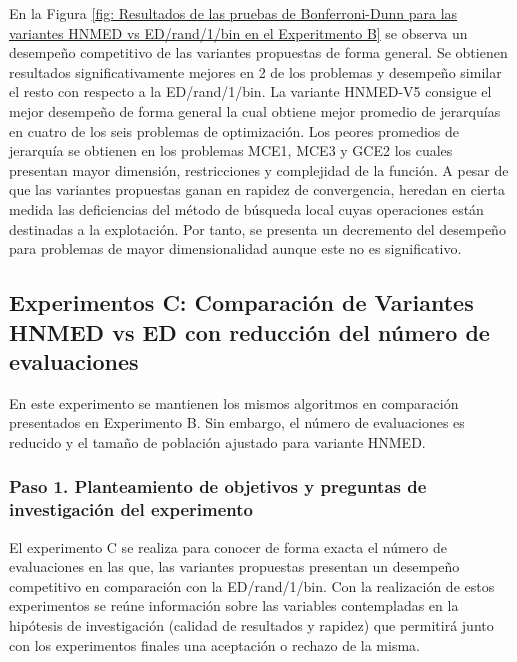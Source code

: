 En la Figura \ref{fig: Resultados de las pruebas de Bonferroni-Dunn para las variantes HNMED vs ED/rand/1/bin en el Experitmento B} se observa un desempeño competitivo de las variantes propuestas de forma general. Se obtienen resultados significativamente mejores en 2 de los problemas y desempeño similar el resto con respecto a la ED/rand/1/bin. La variante HNMED-V5 consigue el mejor desempeño de forma general la cual obtiene mejor promedio de jerarquías en cuatro de los seis problemas de optimización. Los peores promedios de jerarquía se obtienen en los problemas MCE1, MCE3 y GCE2 los cuales presentan mayor dimensión, restricciones y complejidad de la función. A pesar de que las variantes propuestas ganan en rapidez de convergencia, heredan en cierta medida las deficiencias del método de búsqueda local cuyas operaciones están destinadas a la explotación. Por tanto, se presenta un decremento del desempeño para problemas de mayor dimensionalidad aunque este no es significativo.








\subsection{Experimentos C: Comparación de Variantes HNMED vs ED con reducción del número de evaluaciones}
En este experimento se mantienen los mismos algoritmos en comparación presentados en Experimento B. Sin embargo, el número de evaluaciones es reducido y el tamaño de población ajustado para variante HNMED.
\subsubsection{Paso 1. Planteamiento de objetivos y preguntas de investigación del experimento} 
El experimento C se realiza para conocer de forma exacta el número de evaluaciones en las que, las variantes propuestas presentan un desempeño competitivo en comparación con la ED/rand/1/bin. Con la realización de estos experimentos se reúne información sobre las variables contempladas en la hipótesis de investigación (calidad de resultados y rapidez) que permitirá junto con los experimentos finales una aceptación o rechazo de la misma.  

